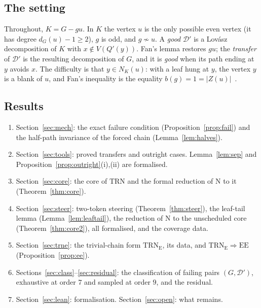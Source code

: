 \documentclass[11pt]{amsart}
\theoremstyle{definition}
\newcommand{\cD}{\mathcal D}
\newcommand{\TRN}{\mathrm{TRN}}
\newcommand{\TRNE}{\mathrm{TRN}_{\mathrm E}}
\newcommand{\EE}{\mathrm{EE}}
\begin{document}
\subsection*{The setting} Throughout, $K=G-gu$. In $K$ the vertex $u$ is the only possible even
vertex (it has degree $d_G(u)-1\ge2$), $g$ is odd, and $g\not\sim u$. A \emph{good} $\cD'$ is a
Lov\'asz decomposition of $K$ with $x\notin V(Q'(y))$. Fan's lemma restores $gu$; the
\emph{transfer} of $\cD'$ is the resulting decomposition of $G$, and it is \emph{good} when its
path ending at $y$ avoids $x$. The difficulty is that $y\in N_K(u)$: with a leaf hung at $y$, the
vertex $y$ is a blank of $u$, and Fan's inequality is the equality $b(g)=1=|Z(u)|$~\cite{TF}.

\subsection*{Results}
\begin{enumerate}
\item Section~\ref{sec:mech}: the exact failure condition (Proposition~\ref{prop:fail}) and the
half-path invariance of the forced chain (Lemma~\ref{lem:halves}).
\item Section~\ref{sec:tools}: proved transfers and outright cases. Lemma~\ref{lem:sep} and
Proposition~\ref{prop:outright}(i),(ii) are formalised.
\item Section~\ref{sec:core}: the core of $\TRN$ and the formal reduction of N to it
(Theorem~\ref{thm:core}).
\item Section~\ref{sec:steer}: two-token steering (Theorem~\ref{thm:steer}), the leaf-tail lemma
(Lemma~\ref{lem:leaftail}), the reduction of N to the unscheduled core (Theorem~\ref{thm:core2}),
all formalised, and the coverage data.
\item Section~\ref{sec:trne}: the trivial-chain form $\TRNE$, its data, and $\TRNE\Rightarrow\EE$
(Proposition~\ref{prop:ee}).
\item Sections~\ref{sec:class}--\ref{sec:residual}: the classification of failing pairs
$(G,\cD')$, exhaustive at order $7$ and sampled at order $9$, and the residual.
\item Section~\ref{sec:lean}: formalisation. Section~\ref{sec:open}: what remains.
\end{enumerate}
\end{document}
